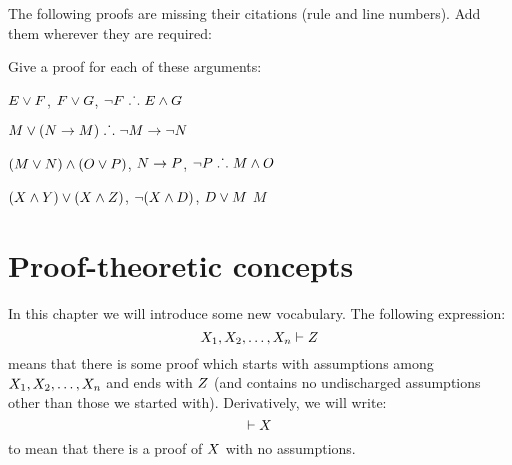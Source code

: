 \practiceproblems
\solutions
\problempart
\label{pr.justifyTFLproof}
The following proofs are missing their citations (rule and line numbers). Add them wherever they are required:
\begin{multicols}{2}
\begin{pf}
 {}
 {}
\end{pf}
\vfill
\begin{pf}
\open
\close
{}
\end{pf}
\columnbreak
\begin{pf}
\open
	 {}
		\open
	\close
\close
{}
\end{pf}
\end{multicols}

\problempart 
Give a proof for each of these arguments:
\begin{earg}
\item $E\vee F$, $F\vee G$, $\neg F \mathrel{\ldotp\dot{}\,\ldotp} E \wedge G$
\item $M\vee(N\rightarrow M) \mathrel{\ldotp\dot{}\,\ldotp} \neg M \rightarrow \neg N$
\item $(M \vee N) \wedge (O \vee P)$, $N \rightarrow P$, $\neg P \mathrel{\ldotp\dot{}\,\ldotp} M\wedge O$
\item $(X\wedge Y)\vee(X\wedge Z)$, $\neg(X\wedge D)$, $D\vee M$ \therefore $M$
\end{earg}



\chapter{Proof-theoretic concepts}\label{s:ProofTheoreticConcepts}
\nonexaminable

In this chapter we will introduce some new vocabulary. The following expression:
$$X_1, X_2, \ldots, X_n \vdash Z$$
means that there is some proof which starts with assumptions among $X_1, X_2, \ldots, X_n$ and ends with $Z$ (and contains no undischarged assumptions other than those we started with). Derivatively, we will write:
$$\vdash X$$
to mean that there is a proof of $X$ with no assumptions. 


